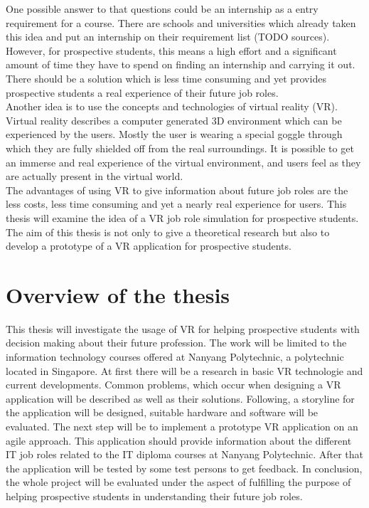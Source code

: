 One possible answer to that questions could be an internship as a entry requirement for a course. There are schools and universities which already taken this idea and put an internship on their requirement list (TODO sources). However, for prospective students, this means a high effort and a significant amount of time they have to spend on finding an internship and carrying it out. There should be a solution which is less time consuming and yet provides prospective students a real experience of their future job roles.\\
Another idea is to use the concepts and technologies of virtual reality (VR). Virtual reality describes a computer generated 3D environment which can be experienced by the users. Mostly the user is wearing a special goggle through which they are fully shielded off from the real surroundings. It is possible to get an immerse and real experience of the virtual environment, and users feel as they are actually present in the virtual world. \cite{Linowes.2015}\\
The advantages of using VR to give information about future job roles are the less costs, less time consuming and yet a nearly real experience for users. This thesis will examine the idea of a VR job role simulation for prospective students. The aim of this thesis is not only to give a theoretical research but also to develop a prototype of a VR application for prospective students. 

\section{Overview of the thesis}
This thesis will investigate the usage of VR for helping prospective students with decision making about their future profession.
The work will be limited to the information technology courses offered at Nanyang Polytechnic, a polytechnic located in Singapore. At first there will be a  research in basic VR technologie and current developments. Common problems, which occur when designing a VR application will be described as well as their solutions. Following, a storyline for the application will be designed, suitable hardware and software will be evaluated. The next step will be to implement a prototype VR application on an agile approach. This application should provide information about the different IT job roles related to the IT diploma courses at Nanyang Polytechnic.  After that the application will be tested by some test persons to get feedback. In conclusion, the whole project will be evaluated under the aspect of fulfilling the purpose of helping prospective students in understanding their future job roles.

